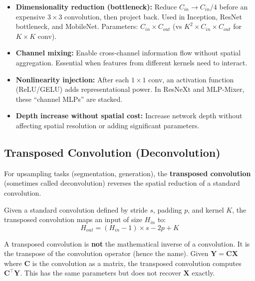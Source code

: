 \begin{properties}
\begin{itemize}
    \item \textbf{Dimensionality reduction (bottleneck):} Reduce $C_{in} \to C_{in}/4$ before an expensive $3 \times 3$ convolution, then project back. Used in Inception, ResNet bottleneck, and MobileNet. Parameters: $C_{in} \times C_{out}$ (vs $K^2 \times C_{in} \times C_{out}$ for $K \times K$ conv).
    \item \textbf{Channel mixing:} Enable cross-channel information flow without spatial aggregation. Essential when features from different kernels need to interact.
    \item \textbf{Nonlinearity injection:} After each $1 \times 1$ conv, an activation function (ReLU/GELU) adds representational power. In ResNeXt and MLP-Mixer, these ``channel MLPs'' are stacked.
    \item \textbf{Depth increase without spatial cost:} Increase network depth without affecting spatial resolution or adding significant parameters.
\end{itemize}
\end{properties}

\subsection{Transposed Convolution (Deconvolution)}

For upsampling tasks (segmentation, generation), the \textbf{transposed convolution} (sometimes called deconvolution) reverses the spatial reduction of a standard convolution.

Given a standard convolution defined by stride $s$, padding $p$, and kernel $K$, the transposed convolution maps an input of size $H_{in}$ to:
\begin{equation}
H_{out} = (H_{in} - 1) \times s - 2p + K
\end{equation}

\begin{note}
A transposed convolution is \textbf{not} the mathematical inverse of a convolution. It is the transpose of the convolution operator (hence the name). Given $\mathbf{Y} = \mathbf{C}\mathbf{X}$ where $\mathbf{C}$ is the convolution as a matrix, the transposed convolution computes $\mathbf{C}^\top \mathbf{Y}$. This has the same parameters but does not recover $\mathbf{X}$ exactly.
\end{note}

